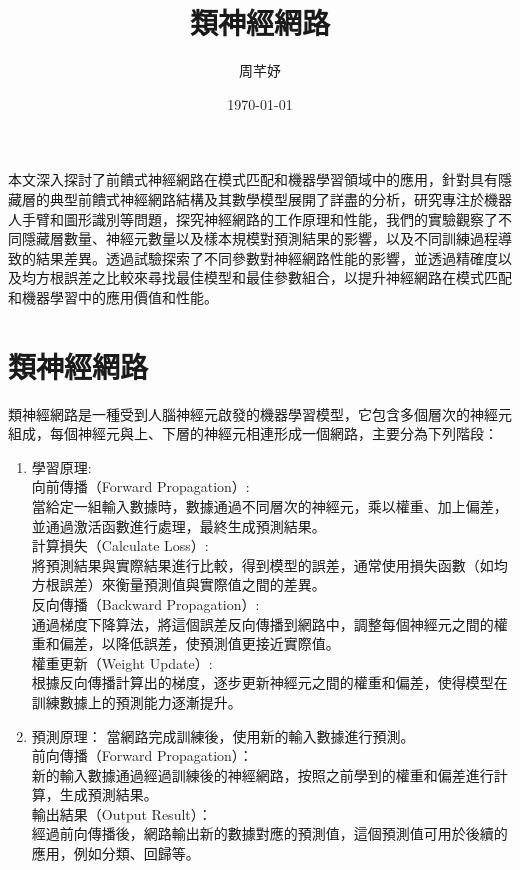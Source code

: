 \documentclass[12pt, a4paper]{article}
\title{類神經網路}
\author{{\SM 周芊妤}}
\date{{\TT \today}}
\begin{document}
\maketitle
\fontsize{12}{22 pt}\selectfont

本文深入探討了前饋式神經網路在模式匹配和機器學習領域中的應用，針對具有隱藏層的典型前饋式神經網路結構及其數學模型展開了詳盡的分析，研究專注於機器人手臂和圖形識別等問題，探究神經網路的工作原理和性能，我們的實驗觀察了不同隱藏層數量、神經元數量以及樣本規模對預測結果的影響，以及不同訓練過程導致的結果差異。透過試驗探索了不同參數對神經網路性能的影響，並透過精確度以及均方根誤差之比較來尋找最佳模型和最佳參數組合，以提升神經網路在模式匹配和機器學習中的應用價值和性能。

\section{類神經網路}
類神經網路是一種受到人腦神經元啟發的機器學習模型，它包含多個層次的神經元組成，每個神經元與上、下層的神經元相連形成一個網路，主要分為下列階段\;：
\begin{enumerate}
\item 學習原理\;:\\
向前傳播（Forward Propagation）:\\
當給定一組輸入數據時，數據通過不同層次的神經元，乘以權重、加上偏差，並通過激活函數進行處理，最終生成預測結果。\\
計算損失（Calculate Loss）:\\
將預測結果與實際結果進行比較，得到模型的誤差，通常使用損失函數（如均方根誤差）來衡量預測值與實際值之間的差異。\\
反向傳播（Backward Propagation）:\\
通過梯度下降算法，將這個誤差反向傳播到網路中，調整每個神經元之間的權重和偏差，以降低誤差，使預測值更接近實際值。\\
權重更新（Weight Update）:\\
根據反向傳播計算出的梯度，逐步更新神經元之間的權重和偏差，使得模型在訓練數據上的預測能力逐漸提升。

\item 預測原理\;：
當網路完成訓練後，使用新的輸入數據進行預測。\\
前向傳播（Forward Propagation）：\\
新的輸入數據通過經過訓練後的神經網路，按照之前學到的權重和偏差進行計算，生成預測結果。\\
輸出結果（Output Result）：\\
經過前向傳播後，網路輸出新的數據對應的預測值，這個預測值可用於後續的應用，例如分類、回歸等。
\end{enumerate}
\end{document}
